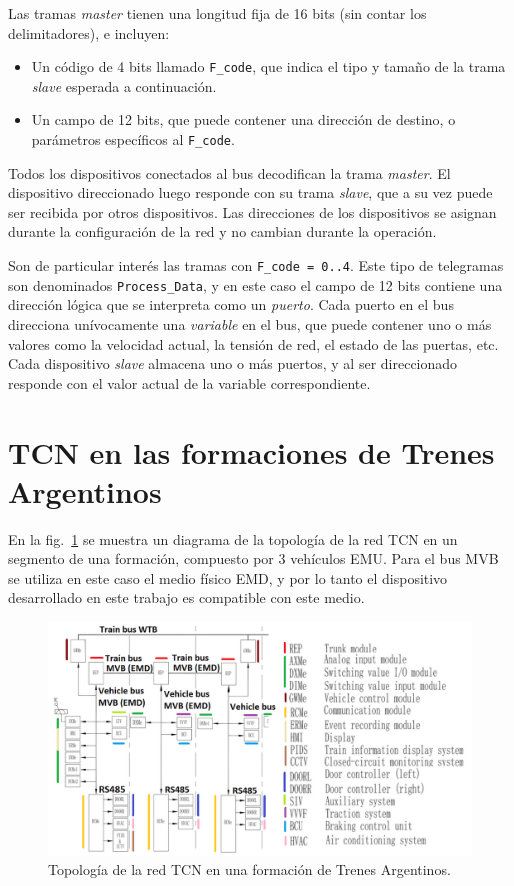Las tramas \textit{master} tienen una longitud fija de 16 bits (sin contar los delimitadores), e incluyen:

\begin{itemize}
\item Un código de 4 bits llamado \texttt{F\_code}, que indica el tipo y tamaño de la trama \textit{slave} esperada a continuación.
\item Un campo de 12 bits, que puede contener una dirección de destino, o parámetros específicos al \texttt{F\_code}.
\end{itemize}

Todos los dispositivos conectados al bus decodifican la trama \textit{master}. El dispositivo direccionado luego responde con su trama \textit{slave}, que a su vez puede ser recibida por otros dispositivos.
Las direcciones de los dispositivos se asignan durante la configuración de la red y no cambian durante la operación.

Son de particular interés las tramas con \texttt{F\_code = 0..4}. Este tipo de telegramas son denominados \texttt{Process\_Data}, y en este caso el campo de 12 bits contiene una dirección lógica que se interpreta como un \textit{puerto}. Cada puerto en el bus direcciona unívocamente una \textit{variable} en el bus, que puede contener uno o más valores como la velocidad actual, la tensión de red, el estado de las puertas, etc. Cada dispositivo \textit{slave} almacena uno o más puertos, y al ser direccionado responde con el valor actual de la variable correspondiente.

\section{TCN en las formaciones de Trenes Argentinos}

En la fig.~\ref{fig:tms} se muestra un diagrama de la topología de la red TCN en un segmento de una formación, compuesto por 3 vehículos EMU. Para el bus MVB se utiliza en este caso el medio físico EMD, y por lo tanto el dispositivo desarrollado en este trabajo es compatible con este medio.

\begin{figure}[htbp]
	\centering
	\includegraphics[width=1\textwidth]{./Figures/tms.png}
	\caption[Topología de la red TCN en una formación de Trenes Argentinos]{Topología de la red TCN en una formación de Trenes Argentinos.
        \\ }
    \label{fig:tms}
\end{figure}


